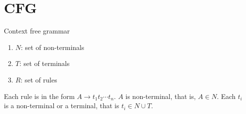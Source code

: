 \section{CFG}
Context free grammar

\begin{enumerate}
	\item $N$: set of non-terminals
	\item $T$: set of terminals
	\item $R$: set of rules
\end{enumerate}

Each rule is in the form $A \to t_1 t_2 \cdots t_n$.
$A$ is non-terminal, that is, $A \in N$.
Each $t_i$ is a non-terminal or a terminal, that is $t_i \in N \cup T$.
